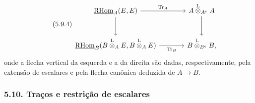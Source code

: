 \begin{equation}\tag{5.9.4}
\begin{tikzcd}[column sep=large,row sep=large]
\uRHom_A(E,E) \arrow[r,"\Tr_A"] \arrow[d] & A\lten_{A^e}A \arrow[d]\\
\uRHom_B(B\lten_AE,B\lten_AE) \arrow[r,"\Tr_B"'] & B\lten_{B^e}B,
\end{tikzcd}
\end{equation}
onde a flecha vertical da esquerda e a da direita são dadas, respectivamente, pela extensão de escalares e pela flecha canônica deduzida de $A\to B$.

\subsubsection*{5.10. Traços e restrição de escalares}

